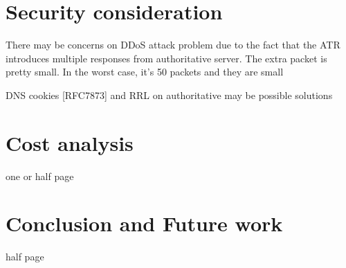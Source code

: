
\section{Security consideration}


There may be concerns on DDoS attack problem due to the fact that the
ATR introduces multiple responses from authoritative server.  The
extra packet is pretty small.  In the worst case, it's 50%
packets and they are small

DNS cookies [RFC7873] and RRL on authoritative may be possible
solutions


\section{Cost analysis}
one or half page

\section{Conclusion and Future work}

half page 
